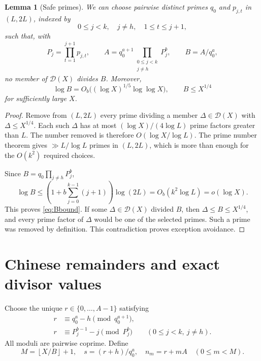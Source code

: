\documentclass[11pt,a4paper]{article}
\newtheorem{lemma}[theorem]{Lemma}
\theoremstyle{definition}\newtheorem{definition}[theorem]{Definition}
\theoremstyle{remark}\newtheorem{remark}[theorem]{Remark}
\newcommand{\floor}[1]{\left\lfloor #1\right\rfloor}\newcommand{\ceil}[1]{\left\lceil #1\right\rceil}
\begin{document}
\begin{lemma}[Safe primes]\label{lem:safe}
We can choose pairwise distinct primes $q_0$ and $p_{j,t}$ in $(L,2L)$, indexed by
\[
 0\le j<k,\quad j\ne h,\quad1\le t\le j+1,
\]
such that, with
\begin{equation}\label{eq:moduli}
 P_j=\prod_{t=1}^{j+1}p_{j,t},\qquad
 A=q_0^{a+1}\prod_{\substack{0\le j<k\\j\ne h}}P_j^b,
 \qquad B=A/q_0^a,
\end{equation}
no member of $\mathcal D(X)$ divides $B$. Moreover,
\begin{equation}\label{eq:Bbound}
 \log B=O_b\bigl((\log X)^{1/5}\log\log X\bigr),
 \qquad B\le X^{1/4}
\end{equation}
for sufficiently large $X$.
\end{lemma}
\begin{proof}
Remove from $(L,2L)$ every prime dividing a member $\Delta\in\mathcal D(X)$ with $\Delta\le X^{1/4}$. Each such $\Delta$ has at most $(\log X)/(4\log L)$ prime factors greater than $L$. The number removed is therefore $O(\log X/\log L)$. The prime number theorem gives $\gg L/\log L$ primes in $(L,2L)$, which is more than enough for the $O(k^2)$ required choices.

Since $B=q_0\prod_{j\ne h}P_j^b$,
\[
 \log B\le\left(1+b\sum_{j=0}^{k-1}(j+1)\right)\log(2L)
 =O_b(k^2\log L)=o(\log X).
\]
This proves \eqref{eq:Bbound}. If some $\Delta\in\mathcal D(X)$ divided $B$, then $\Delta\le B\le X^{1/4}$, and every prime factor of $\Delta$ would be one of the selected primes. Such a prime was removed by definition. This contradiction proves exception avoidance.
\end{proof}

\section{Chinese remainders and exact divisor values}
Choose the unique $r\in\{0,\ldots,A-1\}$ satisfying
\begin{equation}\label{eq:CRT}
 \begin{split}
 r&\equiv q_0^a-h\pmod {q_0^{a+1}},\\
 r&\equiv P_j^{b-1}-j\pmod {P_j^b}\qquad(0\le j<k,\ j\ne h).
 \end{split}
\end{equation}
All moduli are pairwise coprime. Define
\[
 M=\floor{X/B}+1,\quad s=(r+h)/q_0^a,
 \quad n_m=r+mA\quad(0\le m<M).
\]
\end{document}
